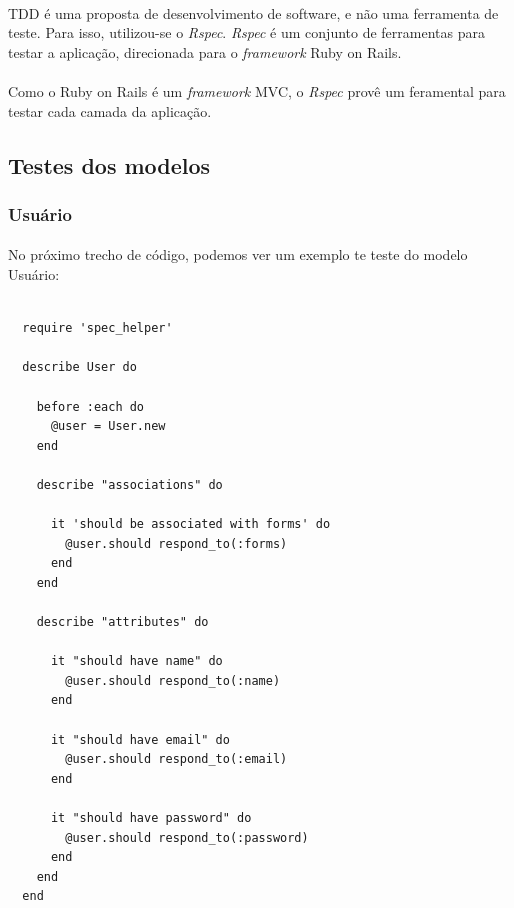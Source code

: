 \documentclass[11pt]{article}
\begin{document}
    \paragraph{}

    TDD é uma proposta de desenvolvimento de software, e não uma 
    ferramenta de teste. Para isso, utilizou-se o {\em Rspec}. {\em Rspec}
    é um conjunto de ferramentas para testar a aplicação, direcionada para o
    {\em framework} Ruby on Rails.
    
    \paragraph{}
    
    Como o Ruby on Rails é um {\em framework} MVC, o {\em Rspec} provê um
    feramental para testar cada camada da aplicação.
        
  \clearpage
    
    \subsection{Testes dos modelos}
    
    \subsubsection{Usuário}
      
    \paragraph{}
    No próximo trecho de código, podemos ver um exemplo te teste do modelo
    Usuário:
    
    {\scriptsize
      \lstset{language=Ruby}
      \begin{lstlisting}

  require 'spec_helper'

  describe User do

    before :each do
      @user = User.new
    end

    describe "associations" do
    
      it 'should be associated with forms' do
        @user.should respond_to(:forms)
      end
    end

    describe "attributes" do

      it "should have name" do
        @user.should respond_to(:name)
      end

      it "should have email" do
        @user.should respond_to(:email)
      end

      it "should have password" do
        @user.should respond_to(:password)
      end
    end
  end
      \end{lstlisting}
    }
    
\end{document}
